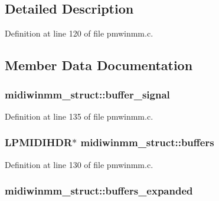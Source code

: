 \subsection{Detailed Description}


Definition at line 120 of file pmwinmm.\+c.



\subsection{Member Data Documentation}
\subsubsection[{\texorpdfstring{buffer\+\_\+signal}{buffer_signal}}]{ midiwinmm\+\_\+struct\+::buffer\+\_\+signal}\hypertarget{structmidiwinmm__struct_a13aff28a564452dca38b6c2066074d12}{}\label{structmidiwinmm__struct_a13aff28a564452dca38b6c2066074d12}


Definition at line 135 of file pmwinmm.\+c.

\subsubsection[{\texorpdfstring{buffers}{buffers}}]{\setlength{\rightskip}{0pt plus 5cm}L\+P\+M\+I\+D\+I\+H\+DR$\ast$ midiwinmm\+\_\+struct\+::buffers}\hypertarget{structmidiwinmm__struct_aa2ca652de8e6c25d2f28d6edd2f8e10e}{}\label{structmidiwinmm__struct_aa2ca652de8e6c25d2f28d6edd2f8e10e}


Definition at line 130 of file pmwinmm.\+c.

\subsubsection[{\texorpdfstring{buffers\+\_\+expanded}{buffers_expanded}}]{ midiwinmm\+\_\+struct\+::buffers\+\_\+expanded}\hypertarget{structmidiwinmm__struct_abab750c48849e1e4919b9ae5663ed7e7}{}\label{structmidiwinmm__struct_abab750c48849e1e4919b9ae5663ed7e7}



